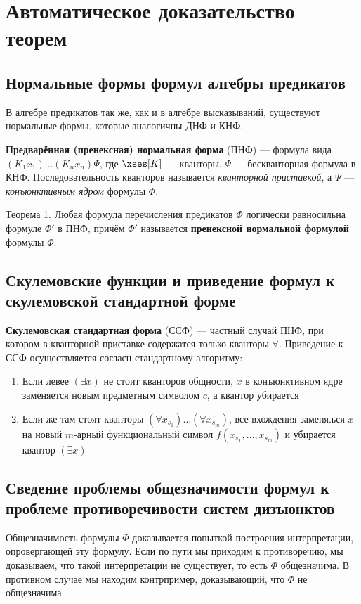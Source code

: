 \section{Автоматическое доказательство теорем}
\subsection{Нормальные формы формул алгебры предикатов}
В алгебре предикатов так же, как и в алгебре высказываний, существуют нормальные формы, которые аналогичны ДНФ и КНФ.

\dftion \textbf{Предварённая (пренексная) нормальная форма} (ПНФ) --- формула вида $(K_1 x_1)\dots(K_n x_n)\Psi$, где $\xses[K]$ --- кванторы, $\Psi$ --- бескванторная формула в КНФ. Последовательность кванторов называется \textit{кванторной приставкой}, а $\Psi$ --- \textit{конъюнктивным ядром} формулы $\Phi$.

\underline{Теорема 1}. Любая формула перечисления предикатов $\Phi$ логически равносильна формуле $\Phi'$ в ПНФ, причём $\Phi'$ называется \textbf{пренексной нормальной формулой} формулы $\Phi$.

\subsection{Скулемовские функции и приведение формул к скулемовской стандартной форме}
\dftion \textbf{Скулемовская стандартная форма} (ССФ) --- частный случай ПНФ, при котором в кванторной приставке содержатся только кванторы $\forall$. Приведение к ССФ осуществляется согласн стандартному алгоритму:

\begin{enumerate}
    \item Если левее $(\exists x)$ не стоит кванторов общности, $x$ в конъюнктивном ядре заменяется новым предметным символом $c$, а квантор убирается
    \item Если же там стоят кванторы $(\forall x_{s_1})\dots(\forall x_{s_m})$, все вхождения заменя.ься $x$ на новый $m$-арный функциональный символ $f(x_{s_1},\dots,x_{s_m})$ и убирается квантор $(\exists x)$
\end{enumerate}

\subsection{Сведение проблемы общезначимости формул к проблеме противоречивости систем дизъюнктов}
Общезначимость формулы $\Phi$ доказывается попыткой построения интерпретации, опровергающей эту формулу. Если по пути мы приходим к противоречию, мы доказываем, что такой интерпретации не существует, то есть $\Phi$ общезначима. В противном случае мы находим контрпример, доказывающий, что $\Phi$ не общезначима.
